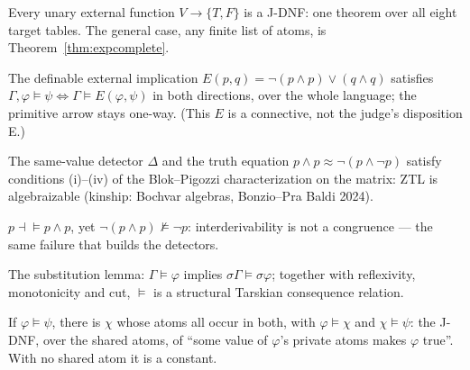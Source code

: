 \begin{theorem}\label{thm:unary}
  \leanok
  Every unary external function $V\to\{T,F\}$ is a J-DNF: one theorem
  over all eight target tables. The general case, any finite list of atoms,
  is Theorem~\ref{thm:expcomplete}.
\end{theorem}

\begin{theorem}\label{thm:ddt}
  \leanok
  The definable external implication
  $E(p,q)=\neg(p\wedge p)\vee(q\wedge q)$ satisfies
  $\Gamma,\varphi \vDash \psi \iff \Gamma \vDash E(\varphi,\psi)$ in
  both directions, over the whole language; the primitive arrow stays
  one-way. (This $E$ is a connective, not the judge's disposition E.)
\end{theorem}

\begin{theorem}\label{thm:bp}
  \leanok
  The same-value detector $\Delta$ and the truth equation
  $p\wedge p \approx \neg(p\wedge\neg p)$ satisfy conditions
  (i)--(iv) of the Blok--Pigozzi characterization on the matrix:
  ZTL is algebraizable (kinship: Bochvar algebras, Bonzio--Pra Baldi
  2024).
\end{theorem}

\begin{theorem}\label{thm:selfext}
  \leanok
  $p \dashv\vDash p\wedge p$, yet $\neg(p\wedge p) \nvDash \neg p$:
  interderivability is not a congruence --- the same failure that
  builds the detectors.
\end{theorem}

\begin{theorem}[Structurality]\label{thm:structural}
  \leanok
  The substitution lemma: $\Gamma\vDash\varphi$ implies
  $\sigma\Gamma\vDash\sigma\varphi$; together with reflexivity,
  monotonicity and cut, $\vDash$ is a structural Tarskian consequence
  relation.
\end{theorem}

\begin{theorem}\label{thm:interp}
  \leanok
  If $\varphi \vDash \psi$, there is $\chi$ whose atoms all occur in both,
  with $\varphi\vDash\chi$ and $\chi\vDash\psi$: the J-DNF, over the shared
  atoms, of ``some value of $\varphi$'s private atoms makes $\varphi$ true''.
  With no shared atom it is a constant.
\end{theorem}

